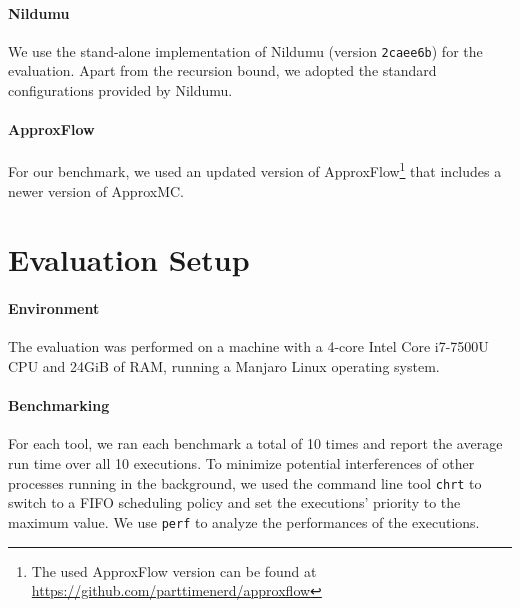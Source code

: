 \paragraph{Nildumu}
We use the stand-alone implementation of Nildumu (version \texttt{2caee6b}) for the evaluation. Apart from the recursion bound, we adopted the standard configurations provided by Nildumu.

\paragraph{ApproxFlow}
For our benchmark, we used an updated version of ApproxFlow\footnote{The used ApproxFlow version can be found at \url{https://github.com/parttimenerd/approxflow}} that includes a newer version of ApproxMC.



\section{Evaluation Setup}

\paragraph{Environment}
The evaluation was performed on a machine with a 4-core Intel Core i7-7500U CPU and 24GiB of RAM, running a Manjaro Linux operating system.

\paragraph{Benchmarking}
For each tool, we ran each benchmark a total of 10 times and report the average run time over all 10 executions. To minimize potential interferences of other processes running in the background, we used the command line tool \texttt{chrt} to switch to a FIFO scheduling policy and set the executions' priority to the maximum value.
We use \texttt{perf} to analyze the performances of the executions.

